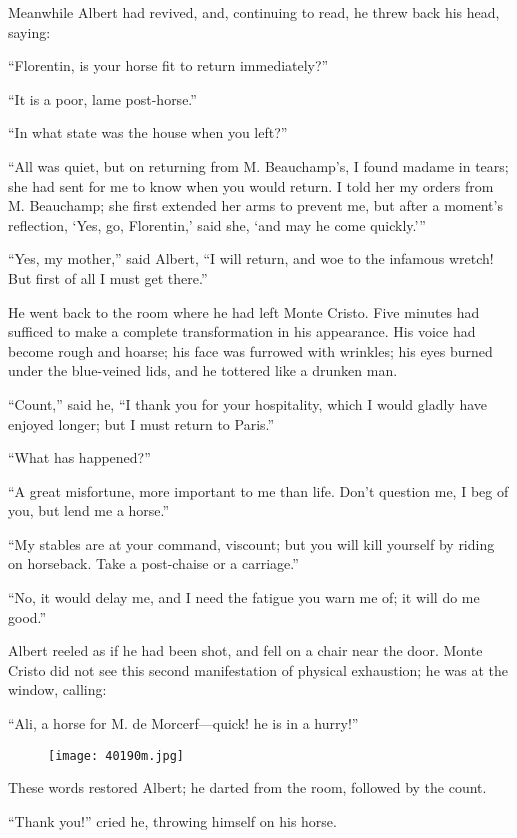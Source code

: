 Meanwhile Albert had revived, and, continuing to read, he threw back
his head, saying:

“Florentin, is your horse fit to return immediately?”

“It is a poor, lame post-horse.”

“In what state was the house when you left?”

“All was quiet, but on returning from M. Beauchamp’s, I found madame in
tears; she had sent for me to know when you would return. I told her my
orders from M. Beauchamp; she first extended her arms to prevent me,
but after a moment’s reflection, ‘Yes, go, Florentin,’ said she, ‘and
may he come quickly.’”

“Yes, my mother,” said Albert, “I will return, and woe to the infamous
wretch! But first of all I must get there.”

He went back to the room where he had left Monte Cristo. Five minutes
had sufficed to make a complete transformation in his appearance. His
voice had become rough and hoarse; his face was furrowed with wrinkles;
his eyes burned under the blue-veined lids, and he tottered like a
drunken man.

“Count,” said he, “I thank you for your hospitality, which I would
gladly have enjoyed longer; but I must return to Paris.”

“What has happened?”

“A great misfortune, more important to me than life. Don’t question me,
I beg of you, but lend me a horse.”

“My stables are at your command, viscount; but you will kill yourself
by riding on horseback. Take a post-chaise or a carriage.”

“No, it would delay me, and I need the fatigue you warn me of; it will
do me good.”

Albert reeled as if he had been shot, and fell on a chair near the
door. Monte Cristo did not see this second manifestation of physical
exhaustion; he was at the window, calling:

“Ali, a horse for M. de Morcerf—quick! he is in a hurry!”

\begin{figure}[ht]
\texttt{[image: 40190m.jpg]}
\end{figure}

These words restored Albert; he darted from the room, followed by the
count.

“Thank you!” cried he, throwing himself on his horse.

